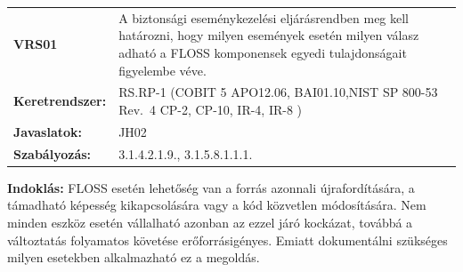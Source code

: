 \documentclass[12pt,magyar,a4paper,oneside]{scrreprt}
\begin{document}
\begin{longtable}[]{@{}ll@{}}
\toprule
\endhead
\begin{minipage}[t]{0.16\columnwidth}\raggedright
\textbf{VRS01}\strut
\end{minipage} & \begin{minipage}[t]{0.79\columnwidth}\raggedright
A biztonsági eseménykezelési eljárásrendben meg kell határozni, hogy
milyen események esetén milyen válasz adható a FLOSS komponensek egyedi
tulajdonságait figyelembe véve.\strut
\end{minipage}\tabularnewline
\begin{minipage}[t]{0.16\columnwidth}\raggedright
\textbf{Keretrendszer:}\strut
\end{minipage} & \begin{minipage}[t]{0.79\columnwidth}\raggedright
RS.RP-1 (COBIT 5 APO12.06, BAI01.10,NIST SP 800-53 Rev.~4 CP-2, CP-10,
IR-4, IR-8 )\strut
\end{minipage}\tabularnewline
\begin{minipage}[t]{0.16\columnwidth}\raggedright
\textbf{Javaslatok:}\strut
\end{minipage} & \begin{minipage}[t]{0.79\columnwidth}\raggedright
JH02\strut
\end{minipage}\tabularnewline
\begin{minipage}[t]{0.16\columnwidth}\raggedright
\textbf{Szabályozás:}\strut
\end{minipage} & \begin{minipage}[t]{0.79\columnwidth}\raggedright
3.1.4.2.1.9., 3.1.5.8.1.1.1.\strut
\end{minipage}\tabularnewline
\bottomrule
\end{longtable}

\textbf{Indoklás: } FLOSS esetén lehetőség van a forrás azonnali
újrafordítására, a támadható képesség kikapcsolására vagy a kód
közvetlen módosítására. Nem minden eszköz esetén vállalható azonban az
ezzel járó kockázat, továbbá a változtatás folyamatos követése
erőforrásigényes. Emiatt dokumentálni szükséges milyen esetekben
alkalmazható ez a megoldás.
\end{document}
